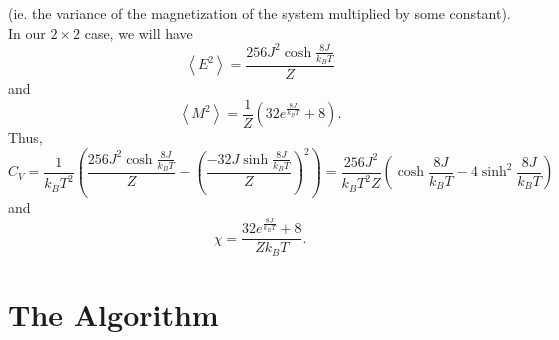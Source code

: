 \documentclass[12pt]{article}
\numberwithin{equation}{section}
\begin{document}
(ie. the variance of the magnetization of the system multiplied by some constant).  In our $2\times2$ case, we will have
$$
\left<E^{2}\right> = \frac{256J^{2}\cosh{\frac{8J}{k_{B}T}}}{Z}
$$
and
$$
\left<M^{2}\right> = \frac{1}{Z}\left(32e^{\frac{8J}{k_{B}T}}+8\right).
$$
Thus,
\begin{equation}
\label{eq:cv2x2}
C_{V}=\frac{1}{k_{B}T^{2}}\left(\frac{256J^{2}\cosh{\frac{8J}{k_{B}T}}}{Z}-\left(\frac{-32J\sinh{\frac{8J}{k_{B}T}}}{Z}\right)^{2}\right)=\frac{256J^{2}}{k_{B}T^{2}Z}\left(\cosh{\frac{8J}{k_{B}T}}-4\sinh^{2}{\frac{8J}{k_{B}T}}\right)
\end{equation}
and
\begin{equation}
\label{eq:chi2x2}
\chi = \frac{32e^{\frac{8J}{k_{B}T}}+8}{Zk_{B}T}.
\end{equation}

\section{The Algorithm}
\label{sec:algorithm}
\end{document}
